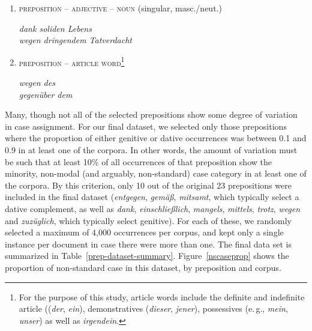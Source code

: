  \begin{enumerate}
  \item \textsc{preposition} -- \textsc{adjective} -- \textsc{noun} (singular, masc./neut.)\\
      \begin{small}
      \emph{dank soliden Lebens}\\
      \emph{wegen dringendem Tatverdacht}
      \end{small}
  
  \item \textsc{preposition} -- \textsc{article word}\footnote{For the purpose of this study, article words include the definite  and indefinite article ((\emph{der}, \emph{ein}), demonstratives (\emph{dieser}, \emph{jener}), possessives (e.\,g., \emph{mein}, \emph{unser}) as well as \emph{irgendein}.}\\
      \begin{small}
      \emph{wegen des}\\
      \emph{gegenüber dem}
      \end{small}

\end{enumerate}

 
Many, though not all of the selected prepositions show some degree of variation in case assignment.
For our final dataset, we selected only those prepositions where the proportion of either genitive or dative occurrences was between 0.1 and 0.9 in at least one of the corpora.
In other words, the amount of variation must be such that at least 10\% of all occurrences of that preposition show the minority, non-modal (and arguably, non-standard) case category in at least one of the corpora.
By this criterion, only 10 out of the original 23 prepositions were included in the final dataset (\textit{entgegen}, \textit{gem\"a\ss}, \textit{mitsamt}, which typically select a dative complement, as well as \textit{dank}, \textit{einschlie{\ss}lich}, \textit{mangels}, \textit{mittels}, \textit{trotz}, \textit{wegen} and \textit{zuz\"uglich}, which typically select genitive).
For each of these, we randomly selected a maximum of 4,000 occurrences per corpus, and kept only a single instance per document in case there were more than one. The final data set is summarized in Table~\ref{prep-dataset-summary}. Figure~\ref{nscaseprop} shows the proportion of non-standard case in this dataset, by preposition and corpus.

